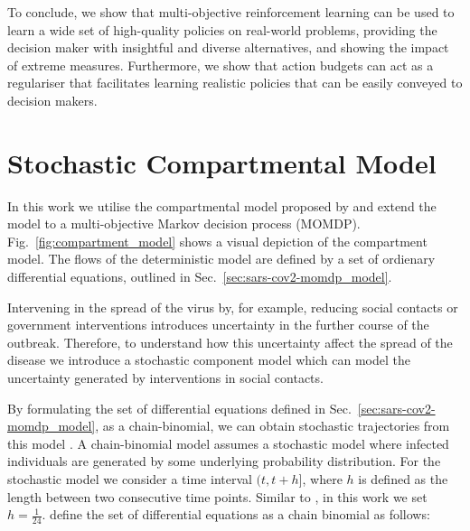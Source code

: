 \documentclass{article}
\renewcommand{\cite}[1]{\citep{#1}}
\begin{document}
To conclude, we show that multi-objective reinforcement learning can be used to learn a wide set of high-quality policies on real-world problems, providing the decision maker with insightful and diverse alternatives, and showing the impact of extreme measures. Furthermore, we show that action budgets can act as a regulariser that facilitates learning realistic policies that can be easily conveyed to decision makers.




\appendix
{}

\section{Stochastic Compartmental Model}
\label{sec:binomial-model}
In this work we utilise the compartmental model proposed by \citet{abrams2021modelling} and extend the model to a multi-objective Markov decision process (MOMDP). Fig.~\ref{fig:compartment_model} shows a visual depiction of the compartment model. The flows of the deterministic model are defined by a set of ordienary differential equations, outlined in Sec.~\ref{sec:sars-cov2-momdp_model}.

Intervening in the spread of the virus by, for example, reducing social contacts or government interventions introduces uncertainty in the further course of the outbreak. Therefore, to understand how this uncertainty affect the spread of the disease we introduce a stochastic component model which can model the uncertainty generated by interventions in social contacts. 

By formulating the set of differential equations defined in Sec.~\ref{sec:sars-cov2-momdp_model}, as a chain-binomial, we can obtain stochastic trajectories from this model \cite{bailey1975mathematical}. A chain-binomial model assumes a stochastic model where infected individuals are generated by some underlying probability distribution. For the stochastic model we consider a time interval $(t, t +h]$, where $h$ is defined as the length between two consecutive time points. Similar to \citet{abrams2021modelling}, in this work we set $h = \frac{1}{24}$. \citet{abrams2021modelling} define the set of differential equations as a chain binomial as follows:
\end{document}
